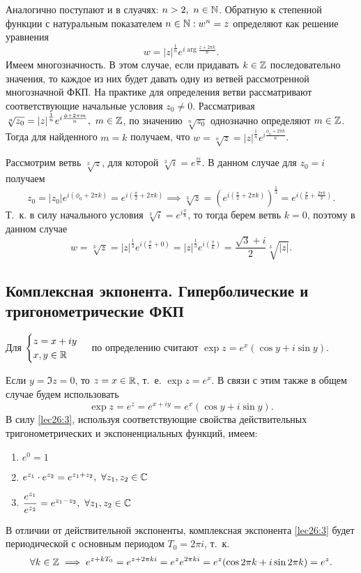 \documentclass[../../main.tex]{subfiles}
\begin{document}
Аналогично поступают и в слуачях: $n > 2,\ n \in \mathbb{N}$.
Обратную к степенной функции с натуральным показателем $n \in \mathbb{N}: w^n = z$
определяют как решение уравнения
\[w = {|z|}^{\textstyle \frac{1}{n}}e^{i\arg\frac{z + 2 \pi k}{n}}.\]
Имеем многозначность. В этом случае, если придавать $k \in \mathbb{Z}$ последовательно
значения, то каждое из них будет давать одну из ветвей рассмотренной
многозначной ФКП. На практике для определения ветви рассматривают 
соответствующие начальные условия 
${z_0 \neq 0}$. Рассматривая $\sqrt[n]{z_0} = {|z|}^{\frac{1}{n}}e^{i
\frac{\phi + 2 \pi m}{n}},\ m \in \mathbb{Z}$, по значению 
$\sqrt[n]{z_0}$ однозначно определяют $m \in \mathbb{Z}$. Тогда для найденного 
$m=k$ получаем, что $w = \sqrt[n]{z} = |z|^{\textstyle 
\frac{1}{n}} e^{i \frac{\phi_0 + 2 \pi k}{n}}$.

\begin{example}
 Рассмотрим ветвь $\sqrt[3]{z}$, для которой 
 $\sqrt[3]{i} = e ^{\textstyle \frac{\pi i}{6}}$. В данном случае для 
 $z_0 = i$ получаем \[z_0 = |z_0| e^{\textstyle i(\phi_0 + 2 \pi k)} = 
 e^{\textstyle i(\frac{\pi}{2} + 2 \pi k)} \implies \sqrt[3]{z} = 
 \left(e^{\textstyle i(\frac{\pi}{2} + 2 \pi k)}\right)^{\textstyle 
 \frac{1}{3}} =
 e^{\textstyle i(\frac{\pi}{6} + \frac{2 \pi k}{3})}.\]
 Т.~к. в силу начального условия 
 $\sqrt[3]{i} = e ^{\textstyle i \frac{\pi}{6}}$, то тогда
 берем ветвь $k = 0$, 
 поэтому в данном случае \[w = \sqrt[3]{z}
 = {|z|}^{\tfrac{1}{3}}e ^{\textstyle i( \frac{\pi}{6} + 0)}
 = {|z|}^{\tfrac{1}{3}}e ^{\textstyle i( \frac{\pi}{6})} 
 = \frac{\sqrt{3} + i }{2} \sqrt[3]{|z|}.\]
\end{example}

\subsection{Комплексная экпонента. Гиперболические и тригонометрические ФКП}
Для 
$
\begin{cases}
 z = x + iy \\
 x, y \in \mathbb{R}
\end{cases}
$
по определению считают $\exp z = e^x(\cos y  + i \sin y) $.

Если $y = \Im z = 0$, то $z = x \in \mathbb{R}$, т.~е.
$\exp z = e^x$.
В связи с этим также в общем случае будем использовать
\begin{equation}
\label{lec26:3}
 \exp z = e^z = e^{x + iy} = e^{x}(\cos y + i \sin y).
\end{equation}
В силу \eqref{lec26:3}, используя соответствующие свойства действительных 
тригонометрических и экспоненциальных функций, имеем:
 \begin{enumerate}
    \item $e^0 = 1$
    \item $e^{z_1} \cdot e^{z_2} = e^{z_1 + z_2},\ \forall z_1, z_2 \in \mathbb{C}$
    \item $\dfrac{e^{z_1}}{e^{z_2}} = e^{z_1 - z_2},\ \forall z_1, z_2 \in \mathbb{C}$
 \end{enumerate}
В отличии от действительной экспоненты, комплексная экспонента \eqref{lec26:3} 
будет 
периодической с основным периодом $T_0 = 2\pi i$, т.~к.
\[\forall k \in \mathbb{Z} \implies e^{z + kT_0} = e^{z + 2 \pi k i} 
= e^{z} e^{2 \pi k i} = e^z(\cos{2 \pi k} + i \sin{2 \pi k}) = e^z.\]
\end{document}
